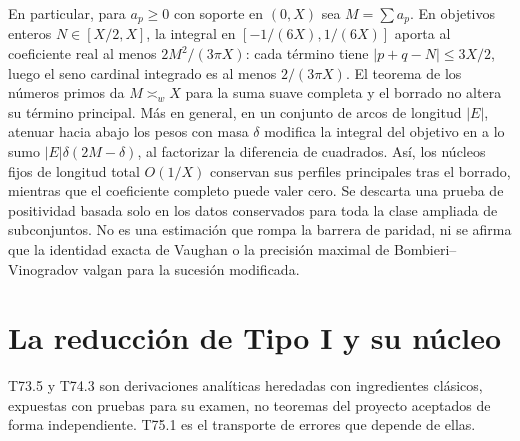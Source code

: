 \documentclass[11pt,a4paper]{article}
\newcommand{\B}[2]{#2}
\newcommand{\B}[2]{#1}
\begin{document}
\B{In particular, for nonnegative $a_p$ supported in $(0,X)$ write $M=\sum a_p$. At integers $N\in[X/2,X]$, integration over $[-1/(6X),1/(6X)]$ contributes at least $2M^2/(3\pi X)$ to the real sum coefficient: each term has $|p+q-N|\le3X/2$, so the integrated sinc is at least $2/(3\pi X)$. The prime number theorem makes $M\asymp_w X$ for the full smooth sum and deletion leaves its leading term unchanged. More generally on a measurable arc set of length $|E|$, changing the weights by downward attenuation of mass $\delta$ alters its target integral by at most $|E|\delta(2M-\delta)$, by factoring the difference of squares. Thus fixed cores of total length $O(1/X)$ retain their leading profiles under this deletion while the full coefficient can be zero. This rules out a positivity proof using only the retained data across the enlarged subset class. It is neither a parity-breaking estimate nor a claim that the exact Vaughan identity or maximal Bombieri--Vinogradov precision holds for the modified sequence.}{En particular, para $a_p\ge0$ con soporte en $(0,X)$ sea $M=\sum a_p$. En objetivos enteros $N\in[X/2,X]$, la integral en $[-1/(6X),1/(6X)]$ aporta al coeficiente real al menos $2M^2/(3\pi X)$: cada término tiene $|p+q-N|\le3X/2$, luego el seno cardinal integrado es al menos $2/(3\pi X)$. El teorema de los números primos da $M\asymp_w X$ para la suma suave completa y el borrado no altera su término principal. Más en general, en un conjunto de arcos de longitud $|E|$, atenuar hacia abajo los pesos con masa $\delta$ modifica la integral del objetivo en a lo sumo $|E|\delta(2M-\delta)$, al factorizar la diferencia de cuadrados. Así, los núcleos fijos de longitud total $O(1/X)$ conservan sus perfiles principales tras el borrado, mientras que el coeficiente completo puede valer cero. Se descarta una prueba de positividad basada solo en los datos conservados para toda la clase ampliada de subconjuntos. No es una estimación que rompa la barrera de paridad, ni se afirma que la identidad exacta de Vaughan o la precisión maximal de Bombieri--Vinogradov valgan para la sucesión modificada.}

\section{\B{The Type I reduction and its kernel}{La reducción de Tipo I y su núcleo}}
\B{T73.5 and T74.3 below are inherited analytical derivations using classical inputs, presented with proofs for scrutiny, not independently accepted theorems of the project. T75.1 is the error transport that depends on them.}{T73.5 y T74.3 son derivaciones analíticas heredadas con ingredientes clásicos, expuestas con pruebas para su examen, no teoremas del proyecto aceptados de forma independiente. T75.1 es el transporte de errores que depende de ellas.}
\end{document}
